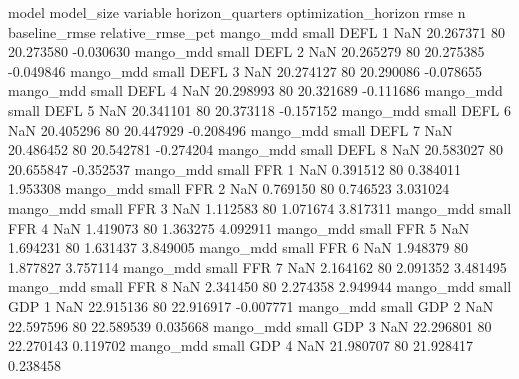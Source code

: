             model model_size variable  horizon_quarters optimization_horizon      rmse  n  baseline_rmse  relative_rmse_pct
        mango_mdd      small     DEFL                 1                  NaN 20.267371 80      20.273580          -0.030630
        mango_mdd      small     DEFL                 2                  NaN 20.265279 80      20.275385          -0.049846
        mango_mdd      small     DEFL                 3                  NaN 20.274127 80      20.290086          -0.078655
        mango_mdd      small     DEFL                 4                  NaN 20.298993 80      20.321689          -0.111686
        mango_mdd      small     DEFL                 5                  NaN 20.341101 80      20.373118          -0.157152
        mango_mdd      small     DEFL                 6                  NaN 20.405296 80      20.447929          -0.208496
        mango_mdd      small     DEFL                 7                  NaN 20.486452 80      20.542781          -0.274204
        mango_mdd      small     DEFL                 8                  NaN 20.583027 80      20.655847          -0.352537
        mango_mdd      small      FFR                 1                  NaN  0.391512 80       0.384011           1.953308
        mango_mdd      small      FFR                 2                  NaN  0.769150 80       0.746523           3.031024
        mango_mdd      small      FFR                 3                  NaN  1.112583 80       1.071674           3.817311
        mango_mdd      small      FFR                 4                  NaN  1.419073 80       1.363275           4.092911
        mango_mdd      small      FFR                 5                  NaN  1.694231 80       1.631437           3.849005
        mango_mdd      small      FFR                 6                  NaN  1.948379 80       1.877827           3.757114
        mango_mdd      small      FFR                 7                  NaN  2.164162 80       2.091352           3.481495
        mango_mdd      small      FFR                 8                  NaN  2.341450 80       2.274358           2.949944
        mango_mdd      small      GDP                 1                  NaN 22.915136 80      22.916917          -0.007771
        mango_mdd      small      GDP                 2                  NaN 22.597596 80      22.589539           0.035668
        mango_mdd      small      GDP                 3                  NaN 22.296801 80      22.270143           0.119702
        mango_mdd      small      GDP                 4                  NaN 21.980707 80      21.928417           0.238458
